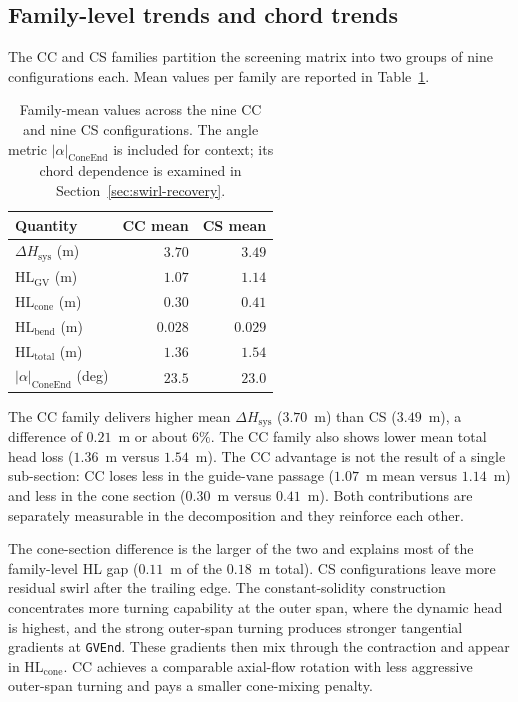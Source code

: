 \subsection{Family-level trends and chord trends}
\label{sec:family-and-chord-trends}

The CC and CS families partition the screening matrix into two groups of nine configurations each. Mean values per family are reported in Table~\ref{tab:family-means}.

\begin{table}[H]
\centering
\small
\caption[Family-mean values]{Family-mean values across the nine CC and nine CS configurations. The angle metric $|\alpha|_{\mathrm{ConeEnd}}$ is included for context; its chord dependence is examined in Section~\ref{sec:swirl-recovery}.}
\label{tab:family-means}
\begin{tabular}{l rr}
\hline
Quantity & CC mean & CS mean \\ \hline
$\Delta H_{\mathrm{sys}}$ (m)        & $3.70$ & $3.49$ \\
$\mathrm{HL_{GV}}$ (m)                & $1.07$ & $1.14$ \\
$\mathrm{HL_{cone}}$ (m)              & $0.30$ & $0.41$ \\
$\mathrm{HL_{bend}}$ (m)              & $0.028$ & $0.029$ \\
$\mathrm{HL_{total}}$ (m)             & $1.36$ & $1.54$ \\
$|\alpha|_{\mathrm{ConeEnd}}$ (deg)   & $23.5$ & $23.0$ \\
\hline
\end{tabular}
\end{table}

The CC family delivers higher mean $\Delta H_{\mathrm{sys}}$ ($3.70$~m) than CS ($3.49$~m), a difference of $0.21$~m or about $6\%$. The CC family also shows lower mean total head loss ($1.36$~m versus $1.54$~m). The CC advantage is not the result of a single sub-section: CC loses less in the guide-vane passage ($1.07$~m mean versus $1.14$~m) and less in the cone section ($0.30$~m versus $0.41$~m). Both contributions are separately measurable in the decomposition and they reinforce each other.

The cone-section difference is the larger of the two and explains most of the family-level HL gap ($0.11$~m of the $0.18$~m total). CS configurations leave more residual swirl after the trailing edge. The constant-solidity construction concentrates more turning capability at the outer span, where the dynamic head is highest, and the strong outer-span turning produces stronger tangential gradients at \texttt{GVEnd}. These gradients then mix through the contraction and appear in $\mathrm{HL_{cone}}$. CC achieves a comparable axial-flow rotation with less aggressive outer-span turning and pays a smaller cone-mixing penalty.

